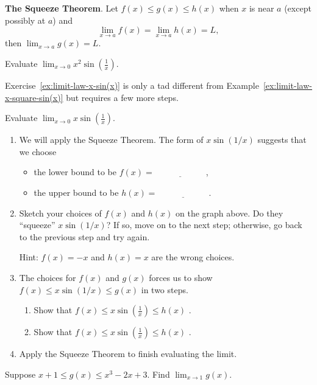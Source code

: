 \documentclass[../main.tex]{subfiles}
\begin{document}
\clearpage

\begin{mdframed}[style=withref]
  \textbf{The Squeeze Theorem}. Let {\(f(x) \le g(x) \le h(x)\)} when \(x\) is near \(a\) (except possibly at \(a\)) and
  \[ { \lim_{x \to a} f(x) = \lim_{x \to a} h(x) = L,} \]
  then
  {\(\lim_{x \to a} g(x) = L\).}

\end{mdframed}

\begin{example} \label{ex:limit-law-x-square-sin(x)}
  Evaluate \(\lim_{x \to 0} x^{2} \sin\left(\frac{1}{x}\right)\).

\end{example}
\clearpage

Exercise~\ref{ex:limit-law-x-sin(x)} is only a tad different from Example~\ref{ex:limit-law-x-square-sin(x)} but requires a few more steps.
\begin{exercise} \label{ex:limit-law-x-sin(x)}
  Evaluate \(\lim_{x \to 0} x \sin\left(\frac{1}{x}\right)\).

  \hfill

  \begin{enumerate}[wide]
    \item We will apply the Squeeze Theorem.  The form of \(x \sin(1/x)\) suggests that we choose
      \begin{itemize}
        \item the lower bound to be \(f(x) = \underline{\hspace{1in}}\),
        \item the upper bound to be \(h(x) = \underline{\hspace{1in}}\).
      \end{itemize}

    \item Sketch your choices of \(f(x)\) and \(h(x)\) on the graph above. Do they \enquote{squeeze} \(x \sin(1/x)\)? If so, move on to the next step; otherwise, go back to the previous step and try again.

      Hint: \(f(x) = -x\) and \(h(x) = x\) are the wrong choices.

  \item The choices for \(f(x)\) and \(g(x)\) forces us to show \(f(x) \le x \sin(1/x) \le g(x)\) in two steps. 
    \begin{enumerate}
      \item Show that \(f(x) \le x \sin\left(\frac{1}{x}\right) \le h(x)\) .


      \item Show that \(f(x) \le x \sin\left(\frac{1}{x}\right) \le h(x)\) .

    \end{enumerate}

  \item Apply the Squeeze Theorem to finish evaluating the limit.

  \end{enumerate}
\end{exercise}
\clearpage

\begin{exercise}
  Suppose \(x+1 \le g(x) \le x^{3} - 2x + 3\). Find \(\lim_{x \to 1} g(x)\).

\end{exercise}
\end{document}
